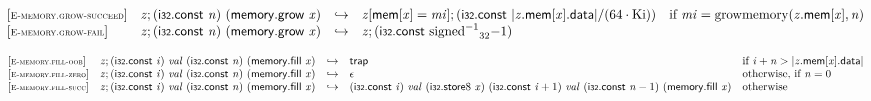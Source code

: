 \vspace{1ex}

$$
\begin{array}{@{}l@{}lcl@{}l@{}}
{[\textsc{\scriptsize E{-}memory.grow{-}succeed}]} \quad & {\mathit{z}} ; (\mathsf{i{\scriptstyle32}}.\mathsf{const}~{\mathit{n}})~(\mathsf{memory.grow}~{\mathit{x}}) &\hookrightarrow& {\mathit{z}}{}[\mathsf{mem}{}[{\mathit{x}}] = {\mathit{mi}}] ; (\mathsf{i{\scriptstyle32}}.\mathsf{const}~{|{{\mathit{z}}.\mathsf{mem}}{{}[{\mathit{x}}]}.\mathsf{data}|} / (64 \cdot {\mathrm{Ki}})) &\quad
  \mbox{if}~{\mathit{mi}} = {\mathrm{growmemory}}({{\mathit{z}}.\mathsf{mem}}{{}[{\mathit{x}}]}, {\mathit{n}}) \\
{[\textsc{\scriptsize E{-}memory.grow{-}fail}]} \quad & {\mathit{z}} ; (\mathsf{i{\scriptstyle32}}.\mathsf{const}~{\mathit{n}})~(\mathsf{memory.grow}~{\mathit{x}}) &\hookrightarrow& {\mathit{z}} ; (\mathsf{i{\scriptstyle32}}.\mathsf{const}~{{{{{\mathrm{signed}}^{{-1}}}}{}}_{32}}{{-1}}) &  \\
\end{array}
$$

\vspace{1ex}

$$
\begin{array}{@{}l@{}lcl@{}l@{}}
{[\textsc{\scriptsize E{-}memory.fill{-}oob}]} \quad & {\mathit{z}} ; (\mathsf{i{\scriptstyle32}}.\mathsf{const}~{\mathit{i}})~{\mathit{val}}~(\mathsf{i{\scriptstyle32}}.\mathsf{const}~{\mathit{n}})~(\mathsf{memory.fill}~{\mathit{x}}) &\hookrightarrow& \mathsf{trap} &\quad
  \mbox{if}~{\mathit{i}} + {\mathit{n}} > {|{{\mathit{z}}.\mathsf{mem}}{{}[{\mathit{x}}]}.\mathsf{data}|} \\
{[\textsc{\scriptsize E{-}memory.fill{-}zero}]} \quad & {\mathit{z}} ; (\mathsf{i{\scriptstyle32}}.\mathsf{const}~{\mathit{i}})~{\mathit{val}}~(\mathsf{i{\scriptstyle32}}.\mathsf{const}~{\mathit{n}})~(\mathsf{memory.fill}~{\mathit{x}}) &\hookrightarrow& \epsilon &\quad
  \mbox{otherwise, if}~{\mathit{n}} = 0 \\
{[\textsc{\scriptsize E{-}memory.fill{-}succ}]} \quad & {\mathit{z}} ; (\mathsf{i{\scriptstyle32}}.\mathsf{const}~{\mathit{i}})~{\mathit{val}}~(\mathsf{i{\scriptstyle32}}.\mathsf{const}~{\mathit{n}})~(\mathsf{memory.fill}~{\mathit{x}}) &\hookrightarrow& (\mathsf{i{\scriptstyle32}}.\mathsf{const}~{\mathit{i}})~{\mathit{val}}~({\mathsf{i{\scriptstyle32}}.\mathsf{store}}{8}~{\mathit{x}})~(\mathsf{i{\scriptstyle32}}.\mathsf{const}~{\mathit{i}} + 1)~{\mathit{val}}~(\mathsf{i{\scriptstyle32}}.\mathsf{const}~{\mathit{n}} - 1)~(\mathsf{memory.fill}~{\mathit{x}}) &\quad
  \mbox{otherwise} \\
\end{array}
$$


